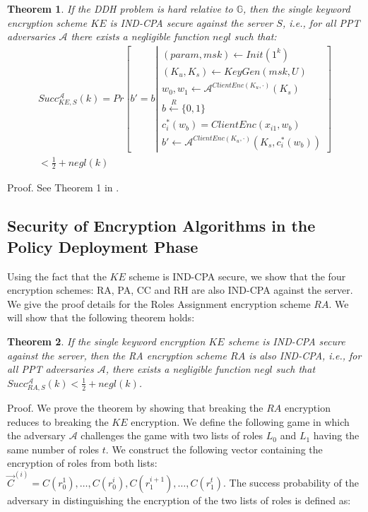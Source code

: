 \documentclass[final,5p,times,twocolumn]{elsarticle}
\newtheorem{theorem}{Theorem}
\begin{document}
\begin{theorem}
If the DDH problem is hard relative to $\mathbb{G}$, then the single keyword encryption
scheme $KE$ is IND-CPA secure against the server $\mathit{S}$, i.e., for all PPT adversaries $\mathcal{A}$ there exists a negligible function $negl$ such that:
\begin{equation}
\begin{array}{l}
Succ_{KE,S}^{\mathcal{A}}(k)=Pr \left[ b'=b \left|
\begin{matrix}
(param, msk) \leftarrow Init(1^k)\\
(K_u,K_s) \leftarrow KeyGen(msk,U)\\
w_0,w_1 \leftarrow \mathcal{A}^{ClientEnc(K_u, \cdot)}(K_s)\\
b \xleftarrow{R} \{0,1\}\\
c_i^*(w_b) = ClientEnc(x_{i1},w_b) \\
b' \leftarrow \mathcal{A}^{ClientEnc(K_u, \cdot)}(K_s,c^*_i(w_b))
\end{matrix}
\right]\right. \\
<\frac{1}{2}+negl(k)
\end{array}
\end{equation}
\end{theorem}

Proof. See Theorem 1 in \cite{Dong2011}.

\subsection{Security of Encryption Algorithms in the Policy Deployment Phase}
Using the fact that the $KE$ scheme is IND-CPA secure, we show that the four encryption schemes: RA, PA, CC and RH are also IND-CPA against the server. We give the proof details for the Roles Assignment encryption scheme $RA$. We will show that the following theorem holds:

\begin{theorem}
If the single keyword encryption $KE$ scheme is IND-CPA secure against the server, then the RA encryption scheme $RA$ is also IND-CPA, i.e., for all PPT adversaries $\mathcal{A}$, there exists a negligible function $negl$ such that
$Succ_{RA,S}^{\mathcal{A}}(k) < \frac{1}{2} + negl(k)$.
\end{theorem}

Proof. We prove the theorem by showing that breaking the $RA$ encryption reduces to breaking the $KE$ encryption. We define the following game in which the adversary $\mathcal{A}$ challenges the game with two lists of roles $L_0$ and $L_1$ having the same number of roles $t$. We construct the following vector containing the encryption of roles from both lists: $\vec{C}^{(i)}=C(r_0^1),\ldots,C(r_0^i),C(r_1^{i+1}),\ldots,C(r_1^t)$. The success probability of the adversary in distinguishing the encryption of the two lists of roles is defined as:
\end{document}
